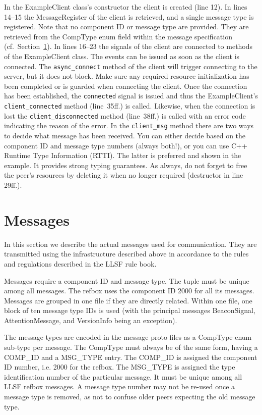 \documentclass[a4paper]{article}
\newcommand{\refsec}[1]{Section~\ref{#1}}
\begin{document}
In the ExampleClient class's constructor the client is created (line
12). In lines 14--15 the MessageRegister of the client is retrieved,
and a single message type is registered. Note that no component ID or
message type are provided. They are retrieved from the CompType enum
field within the message specification (cf.~\refsec{sec:messages}). In
lines 16--23 the signals of the client are connected to methods of the
ExampleClient class. The events can be issued as soon as the client is
connected. The \texttt{async\_connect} method of the client will
trigger connecting to the server, but it does not block. Make sure any
required resource initialization has been completed or is guarded when
connecting the client. Once the connection has been established, the
\texttt{connected} signal is issued and thus the ExampleClient's
\texttt{client\_connected} method (line~35ff.) is called. Likewise,
when the connection is lost the \texttt{client\_disconnected} method
(line~38ff.) is called with an error code indicating the reason of the
error. In the \texttt{client\_msg} method there are two ways to decide
what message has been received. You can either decide based on the
component ID and message type numbers (always both!), or you can use
C++ Runtime Type Information (RTTI). The latter is preferred and shown
in the example. It provides strong typing guarantees. As always, do
not forget to free the peer's resources by deleting it when no longer
required (destructor in line 29ff.).

\section{Messages}
\label{sec:messages}
In this section we describe the actual messages used for
communication. They are transmitted using the infrastructure described
above in accordance to the rules and regulations described in the LLSF
rule book.

Messages require a component ID and message type. The tuple must be
unique among all messages. The refbox uses the component ID 2000 for
all its messages. Messages are grouped in one file if they are
directly related. Within one file, one block of ten message type IDs
is used (with the principal messages BeaconSignal, AttentionMessage,
and VersionInfo being an exception).

The message types are encoded in the message proto files as a CompType
enum sub-type per message. The CompType must always be of the same
form, having a COMP\_ID and a MSG\_TYPE entry. The COMP\_ID is
assigned the component ID number, i.e. 2000 for the refbox. The
MSG\_TYPE is assigned the type identification number of the particular
message. It must be unique among all LLSF refbox messages. A message
type number may not be re-used once a message type is removed, as not
to confuse older peers expecting the old message type.
\end{document}
